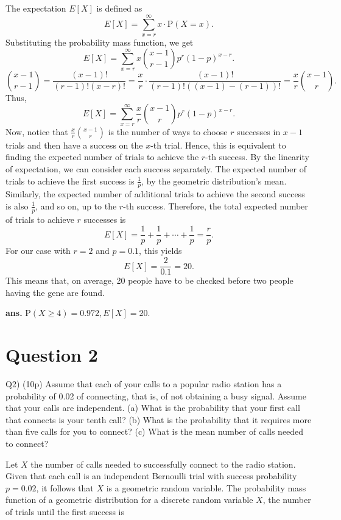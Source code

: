 \documentclass[12pt]{article}
\begin{document}
The expectation \( E[X] \) is defined as \[ E[X] = \sum_{x=r}^{\infty} x \cdot \mathrm{P}(X = x). \] Substituting the probability mass function, we get \[ E[X] = \sum_{x=r}^{\infty} x \binom{x-1}{r-1} p^r (1-p)^{x-r}. \] \[ \binom{x-1}{r-1} = \frac{(x-1)!}{(r-1)!(x-r)!} = \frac{x}{r} \cdot \frac{(x-1)!}{(r-1)!((x-1)-(r-1))!} = \frac{x}{r} \binom{x-1}{r}. \] Thus, \[ E[X] = \sum_{x=r}^{\infty} \frac{x}{r} \binom{x-1}{r} p^r (1-p)^{x-r}. \] Now, notice that \( \frac{x}{r} \binom{x-1}{r} \) is the number of ways to choose \( r \) successes in \( x-1 \) trials and then have a success on the \( x \)-th trial. Hence, this is equivalent to finding the expected number of trials to achieve the \( r \)-th success.  By the linearity of expectation, we can consider each success separately. The expected number of trials to achieve the first success is \( \frac{1}{p} \), by the geometric distribution's mean. Similarly, the expected number of additional trials to achieve the second success is also \( \frac{1}{p} \), and so on, up to the \( r \)-th success. Therefore, the total expected number of trials to achieve \( r \) successes is \[ E[X] = \frac{1}{p} + \frac{1}{p} + \cdots + \frac{1}{p} = \frac{r}{p}. \] For our case with \( r = 2 \) and \( p = 0.1 \), this yields \[ E[X] = \frac{2}{0.1} = 20. \] This means that, on average, 20 people have to be checked before two people having the gene are found.
\AnswerTag

\vfill
\begin{flushright}
\textbf{ans.} \(  \mathrm{P}(X \geq 4) = 0.972, E[X] = 20.\)
\end{flushright}


\newpage
\section*{Question 2}
\begin{q}
Q2) (10p) Assume that each of your calls to a popular radio station has a probability of 0.02 of connecting, that is, of not obtaining a busy signal. Assume that your calls are independent.
(a) What is the probability that your first call that connects is your tenth call?
(b) What is the probability that it requires more than five calls for you to connect?
(c) What is the mean number of calls needed to connect?
\end{q}


Let \( X \) the number of calls needed to successfully connect to the radio station. Given that each call is an independent Bernoulli trial with success probability \( p = 0.02 \), it follows that \( X \) is a geometric random variable. The probability mass function of a geometric distribution for a discrete random variable \( X \), the number of trials until the first success is
\end{document}
